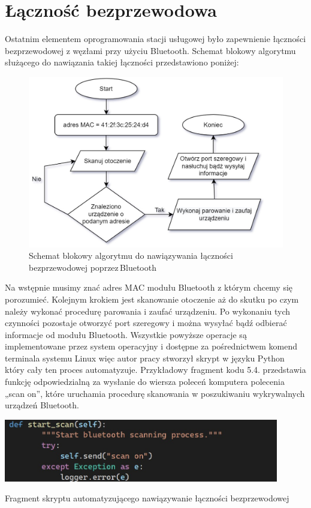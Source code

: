\documentclass[12pt, twoside, openany]{mwrep}
\begin{document}
\section{Łączność bezprzewodowa}
Ostatnim elementem oprogramowania stacji usługowej było zapewnienie łączności bezprzewodowej z węzłami przy użyciu Bluetooth. Schemat blokowy algorytmu służącego do nawiązania takiej łączności przedstawiono poniżej:
\begin{figure}[H]
\centering
\includegraphics[width=\textwidth]{algorytm}
\caption{Schemat blokowy algorytmu do nawiązywania łączności bezprzewodowej poprzez\,Bluetooth}
\end{figure}
\par
Na wstępnie musimy znać adres MAC modułu Bluetooth z którym chcemy się porozumieć. Kolejnym krokiem jest skanowanie otoczenie aż do skutku po czym należy wykonać procedurę parowania i zaufać urządzeniu. Po wykonaniu tych czynności pozostaje otworzyć port szeregowy i można wysyłać bądź odbierać informacje od modułu Bluetooth. Wszystkie powyższe operacje są implementowane przez system operacyjny i dostępne za pośrednictwem komend terminala systemu Linux więc autor pracy stworzył skrypt w języku Python który cały ten proces automatyzuje. Przykładowy fragment kodu 5.4. przedstawia funkcję odpowiedzialną za wysłanie do wiersza poleceń komputera polecenia „scan on”, które uruchamia procedurę skanowania w poszukiwaniu wykrywalnych urządzeń Bluetooth.

\begin{algorithm}[H]
\centering
\includegraphics[width=0.9\textwidth]{kod_bt}
\caption{Fragment skryptu automatyzującego nawiązywanie łączności bezprzewodowej}
\end{algorithm}
\end{document}
